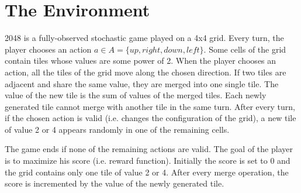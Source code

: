 \documentclass[journal, a4paper]{IEEEtran}
\newcommand{\argmax}{\operatornamewithlimits{argmax}}
\newcommand{\x}{\mathbf{x}}
\newcommand{\y}{\mathbf{y}}
\newcommand{\ypred}{\mathbf{\hat y}}
\begin{document}




\section{The Environment}

2048 is a fully-observed stochastic game played on a 4x4 grid. Every turn, the player chooses an action $a \in \textit{A}=\{ up, right, down, left \}$. Some cells of the grid contain tiles whose values are some power of 2. When the player chooses an action, all the tiles of the grid move along the chosen direction. If two tiles are adjacent and share the same value, they are merged into one single tile. The value of the new tile is the sum of values of the merged tiles. Each newly generated tile cannot merge with another tile in the same turn. After every turn, if the chosen action is valid (i.e. changes the configuration of the grid), a new tile of value 2 or 4 appears randomly in one of the remaining cells. 

The game ends if none of the remaining actions are valid. The goal of the player is to maximize his score (i.e. reward function). Initially the score is set to $0$ and the grid contains only one tile of value 2 or 4. After every merge operation, the score is incremented by the value of the newly generated tile. 
\end{document}
